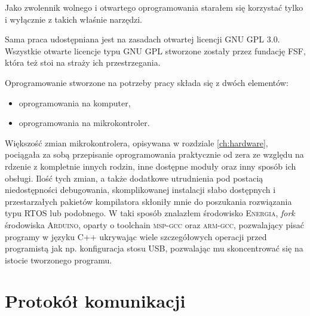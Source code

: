 \label{ch:software}

Jako zwolennik wolnego i otwartego oprogramowania starałem się korzystać tylko i wyłącznie z takich właśnie narzędzi.

Sama praca udostępniana jest na zasadach otwartej licencji \textsc{GNU GPL 3.0}. Wszystkie otwarte licencje typu \textsc{GNU GPL} stworzone zostały przez fundację FSF, która też stoi na straży ich przestrzegania.

Oprogramowanie stworzone na potrzeby pracy składa się z dwóch elementów:
\begin{itemize}
 \item oprogramowania na komputer,
 \item oprogramowania na mikrokontroler.\\
\end{itemize}

Większość zmian mikrokontrolera, opisywana w rozdziale \ref{ch:hardware}, pociągała za sobą przepisanie oprogramowania praktycznie od zera ze względu na rdzenie z kompletnie innych rodzin, inne dostępne moduły oraz inny sposób ich obsługi. Ilość tych zmian, a także dodatkowe utrudnienia pod postacią niedostępności debugowania, skomplikowanej instalacji słabo dostępnych i przestarzałych pakietów kompilatora skłoniły mnie do poszukania rozwiązania typu RTOS lub podobnego.
W taki sposób znalazłem środowisko \textsc{Energia}, \textit{fork} środowiska \textsc{Arduino}, oparty o toolchain \textsc{msp-gcc} oraz \textsc{arm-gcc}, pozwalający pisać programy w języku C++ ukrywając wiele szczegółowych operacji przed programistą jak np. konfiguracja stosu USB, pozwalając mu skoncentrować się na istocie tworzonego programu.\\

\section{Protokół komunikacji}

